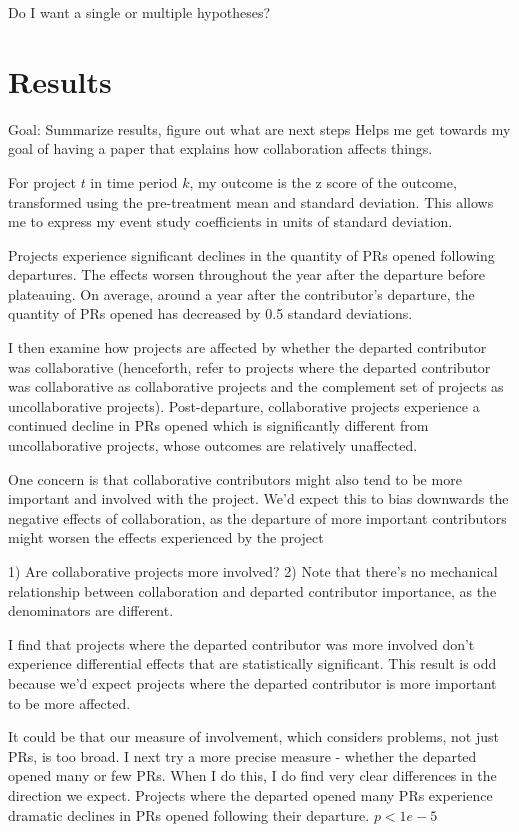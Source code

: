 \documentclass[12pt,notitlepage]{article}
\begin{document}
Do I want a single or multiple hypotheses?


\section{Results} \label{sec:result}
Goal: Summarize results, figure out what are next steps
Helps me get towards my goal of having a paper that explains how collaboration affects things. 

For project $t$ in time period $k$, my outcome is the z score of the outcome, transformed using the pre-treatment mean and standard deviation. This allows me to express my event study coefficients in units of standard deviation. 

Projects experience significant declines in the quantity of PRs opened following departures. The effects worsen throughout the year after the departure before plateauing. On average, around a year after the contributor's departure, the quantity of PRs opened has decreased by 0.5 standard deviations. 

I then examine how projects are affected by whether the departed contributor was collaborative (henceforth, refer to projects where the departed contributor was collaborative as collaborative projects and the complement set of projects as uncollaborative projects). Post-departure, collaborative projects experience a continued decline in PRs opened which is significantly different from uncollaborative projects, whose outcomes are relatively unaffected. 

One concern is that collaborative contributors might also tend to be more important and involved with the project. We'd expect this to bias downwards the negative effects of collaboration, as the departure of more important contributors might worsen the effects experienced by the project

1) Are collaborative projects more involved?
2) Note that there's no mechanical relationship between collaboration and departed contributor importance, as the denominators are different. 

I find that projects where the departed contributor was more involved don't experience differential effects that are statistically significant. This result is odd because we'd expect projects where the departed contributor is more important to be more affected. 

It could be that our measure of involvement, which considers problems, not just PRs, is too broad. I next try a more precise measure - whether the departed opened many or few PRs. When I do this, I do find very clear differences in the direction we expect. Projects where the departed opened many PRs experience dramatic declines in PRs opened following their departure. $p<1e-5$
\end{document}
